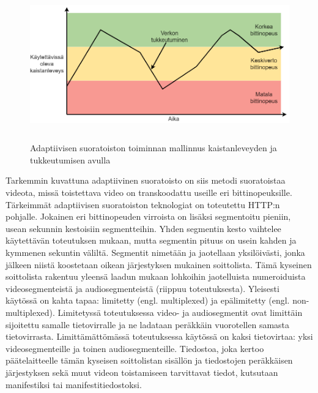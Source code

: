 \documentclass[finnish, 12pt, a4paper, elec, utf8, a-1b, online]{aaltothesis}
\begin{document}
\begin{figure}[htb]
  \centering
  \includegraphics[height=6.5cm]{./img/abr-bandwidth.png}
  \caption{Adaptiivisen suoratoiston toiminnan mallinnus kaistanleveyden ja tukkeutumisen avulla \label{kuva4}}
\end{figure}

\noindent Tarkemmin kuvattuna adaptiivinen suoratoisto on siis metodi suoratoistaa videota, missä toistettava video on transkoodattu useille eri bittinopeuksille. Tärkeimmät adaptiivisen suoratoiston teknologiat on toteutettu HTTP:n pohjalle. Jokainen eri bittinopeuden virroista on lisäksi segmentoitu pieniin, usean sekunnin kestoisiin segmentteihin. Yhden segmentin kesto vaihtelee käytettävän toteutuksen mukaan, mutta segmentin pituus on usein kahden ja kymmenen sekuntin väliltä. Segmentit nimetään ja jaotellaan yksilöivästi, jonka jälkeen niistä koostetaan oikean järjestyksen mukainen soittolista. Tämä kyseinen soittolista rakentuu yleensä laadun mukaan lohkoihin jaotelluista numeroiduista videosegmenteistä ja audiosegmenteistä (riippuu toteutuksesta). Yleisesti käytössä on kahta tapaa: limitetty (engl. multiplexed) ja epälimitetty (engl. non-multiplexed). Limitetyssä toteutuksessa video- ja audiosegmentit ovat limittäin sijoitettu samalle tietovirralle ja ne ladataan peräkkäin vuorotellen samasta tietovirrasta. Limittämättömässä toteutuksessa käytössä on kaksi tietovirtaa: yksi videosegmenteille ja toinen audiosegmenteille. Tiedostoa, joka kertoo päätelaitteelle tämän kyseisen soittolistan sisällön ja tiedostojen peräkkäisen järjestyksen sekä muut videon toistamiseen tarvittavat tiedot, kutsutaan manifestiksi tai manifestitiedostoksi. \\
\end{document}
